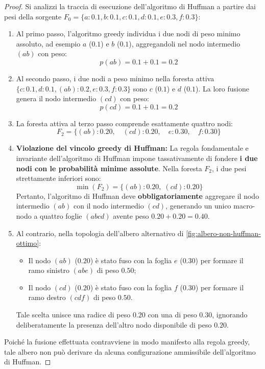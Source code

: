 \begin{proof}
Si analizzi la traccia di esecuzione dell'algoritmo di Huffman a partire dai pesi della sorgente $F_0 = \{a: 0.1, b: 0.1, c: 0.1, d: 0.1, e: 0.3, f: 0.3\}$:
\begin{enumerate}
  \item Al primo passo, l'algoritmo greedy individua i due nodi di peso minimo assoluto, ad esempio $a$ ($0.1$) e $b$ ($0.1$), aggregandoli nel nodo intermedio $(ab)$ con peso:
  \begin{equation}
    p(ab) = 0.1 + 0.1 = 0.2
  \end{equation}
  \item Al secondo passo, i due nodi a peso minimo nella foresta attiva $\{c: 0.1, d: 0.1, (ab): 0.2, e: 0.3, f: 0.3\}$ sono $c$ ($0.1$) e $d$ ($0.1$). La loro fusione genera il nodo intermedio $(cd)$ con peso:
  \begin{equation}
    p(cd) = 0.1 + 0.1 = 0.2
  \end{equation}
  \item La foresta attiva al terzo passo comprende esattamente quattro nodi:
  \begin{equation}
    F_2 = \{(ab): 0.20, \quad (cd): 0.20, \quad e: 0.30, \quad f: 0.30\}
  \end{equation}
  \item \textbf{Violazione del vincolo greedy di Huffman:}
  La regola fondamentale e invariante dell'algoritmo di Huffman impone tassativamente di fondere \textbf{i due nodi con le probabilit\`a minime assolute}. Nella foresta $F_2$, i due pesi strettamente inferiori sono:
  \begin{equation}
    \min(F_2) = \{(ab): 0.20, \; (cd): 0.20\}
  \end{equation}
  Pertanto, l'algoritmo di Huffman deve \textbf{obbligatoriamente} aggregare il nodo intermedio $(ab)$ con il nodo intermedio $(cd)$, generando un unico macro-nodo a quattro foglie $(abcd)$ avente peso $0.20 + 0.20 = 0.40$.
  \item Al contrario, nella topologia dell'albero alternativo di \autoref{fig:albero-non-huffman-ottimo}:
  \begin{itemize}
    \item Il nodo $(ab)$ ($0.20$) \`e stato fuso con la foglia $e$ ($0.30$) per formare il ramo sinistro $(abe)$ di peso $0.50$;
    \item Il nodo $(cd)$ ($0.20$) \`e stato fuso con la foglia $f$ ($0.30$) per formare il ramo destro $(cdf)$ di peso $0.50$.
  \end{itemize}
  Tale scelta unisce una radice di peso $0.20$ con una di peso $0.30$, ignorando deliberatamente la presenza dell'altro nodo disponibile di peso $0.20$.
\end{enumerate}
Poich\'e la fusione effettuata contravviene in modo manifesto alla regola greedy, tale albero non pu\`o derivare da alcuna configurazione ammissibile dell'algoritmo di Huffman.
\end{proof}

